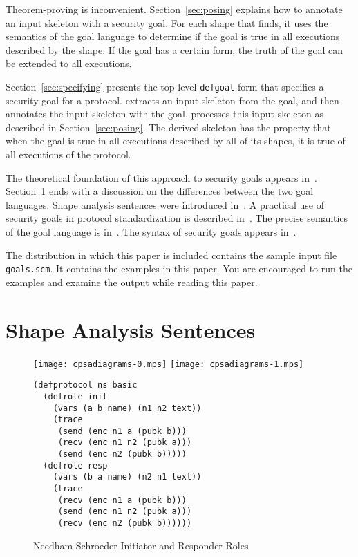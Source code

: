 \documentclass[12pt]{article}
\begin{document}
Theorem-proving is inconvenient.  Section~\ref{sec:posing} explains
how to annotate an input skeleton with a security goal.  For each
shape that {\cpsa} finds, it uses the semantics of the goal language
to determine if the goal is true in all executions described by the
shape.  If the goal has a certain form, the truth of the goal can be
extended to all executions.

Section~\ref{sec:specifying} presents the top-level \texttt{defgoal}
form that specifies a security goal for a protocol.  {\cpsa} extracts
an input skeleton from the goal, and then annotates the input skeleton
with the goal.  {\cpsa} processes this input skeleton as described in
Section~\ref{sec:posing}.  The derived skeleton has the property that
when the goal is true in all executions described by all of its shapes,
it is true of all executions of the protocol.

The theoretical foundation of this approach to security goals appears
in~\cite{Guttman14}.  Section~\ref{sec:sas} ends with a discussion on
the differences between the two goal languages.  Shape analysis
sentences were introduced in~\cite{Ramsdell12}.  A practical use of
security goals in protocol standardization is described
in~\cite{GuttmanLiskovRowe14}.  The precise semantics of the goal
language is in~\cite{cpsaspec09}.  The syntax of security goals
appears in~\cite[Table~2]{cpsaprimer09}.

The distribution in which this paper is included contains the sample
input {\cpsa} file \texttt{goals.scm}.  It contains the examples in
this paper.  You are encouraged to run the examples and examine the
output while reading this paper.

\section{Shape Analysis Sentences}\label{sec:sas}

\begin{figure}
\begin{center}
\texttt{[image: cpsadiagrams-0.mps]}\hfil
\texttt{[image: cpsadiagrams-1.mps]}\\
\end{center}
\begin{center}
\begin{minipage}{3in}
\begin{verbatim}
(defprotocol ns basic
  (defrole init
    (vars (a b name) (n1 n2 text))
    (trace
     (send (enc n1 a (pubk b)))
     (recv (enc n1 n2 (pubk a)))
     (send (enc n2 (pubk b)))))
  (defrole resp
    (vars (b a name) (n2 n1 text))
    (trace
     (recv (enc n1 a (pubk b)))
     (send (enc n1 n2 (pubk a)))
     (recv (enc n2 (pubk b))))))
\end{verbatim}
\end{minipage}
\end{center}
\caption{Needham-Schroeder Initiator and Responder Roles}
\label{fig:ns roles}
\end{figure}
\end{document}
